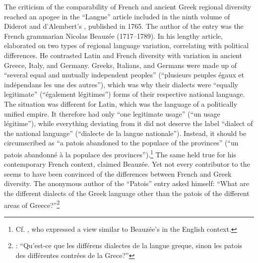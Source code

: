 The criticism of the comparability of French and ancient Greek regional diversity reached an apogee in the “Langue” article included in the ninth volume of Diderot and d’Alembert’s , published in 1765. The author of the entry was the French grammarian Nicolas Beauzée (1717–1789). In his lengthy article, \citet[249]{Beauzee1765} elaborated on two types of regional language variation, correlating with political differences. He contrasted Latin and French diversity with variation in ancient Greece, Italy, and Germany. Greeks, Italians, and Germans were made up of “several equal and mutually independent peoples” (“plusieurs peuples égaux et indépendans les uns des autres”), which was why their dialects were “equally legitimate” (“également légitimes”) forms of their respective national language. The situation was different for Latin, which was the language of a politically unified empire. It therefore had only “one legitimate usage” (“un usage légitime”), while everything deviating from it did not deserve the label “dialect of the national language” (“dialecte de la langue nationale”). Instead, it should be circumscribed as “a patois abandoned to the populace of the provinces” (“un patois abandonné à la populace des provinces”).\footnote{Cf. \citet[135--136]{Priestley1762}, who expressed a view similar to Beauzée’s in the English context.} The same held true for his contemporary French context, claimed Beauzée. Yet not every contributor to the  seems to have been convinced of the differences between French and Greek diversity. The anonymous author of the “Patois” entry asked himself: “What are the different dialects of the Greek language other than the patois of the different areas of Greece?”\footnote{\citet[174]{Anon.1765}: “Qu’est-ce que les différens dialectes de la langue greque, sinon les patois des différentes contrées de la Grece?”}

